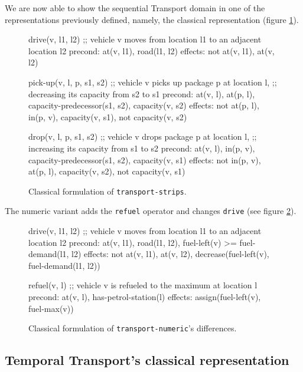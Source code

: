 We are now able to show the sequential Transport domain in one of the representations
previously defined, namely,
the classical representation (figure \ref{code:classical-strips}).



\begin{figure}[htb]
\begin{code}
drive(v, l1, l2)
  ;; vehicle v moves from location l1 to an adjacent location l2
  precond: at(v, l1), road(l1, l2)
  effects: not at(v, l1), at(v, l2)

pick-up(v, l, p, s1, s2)
  ;; vehicle v picks up package p at location l,
  ;; decreasing its capacity from s2 to s1
  precond: at(v, l), at(p, l), capacity-predecessor(s1, s2),
           capacity(v, s2)
  effects: not at(p, l), in(p, v), capacity(v, s1),
           not capacity(v, s2)
  
drop(v, l, p, s1, s2)
  ;; vehicle v drops package p at location l,
  ;; increasing its capacity from s1 to s2
  precond: at(v, l), in(p, v), capacity-predecessor(s1, s2),
           capacity(v, s1)
  effects: not in(p, v), at(p, l), capacity(v, s2),
           not capacity(v, s1)
\end{code}
\caption{Classical formulation of \texttt{transport-strips}.}
\label{code:classical-strips}
\end{figure}

The numeric variant adds the \verb+refuel+ operator and changes \verb+drive+ (see figure \ref{code:classical-numeric}).

\begin{figure}[htb]
\begin{code}
drive(v, l1, l2)
  ;; vehicle v moves from location l1 to an adjacent location l2
  precond: at(v, l1), road(l1, l2), fuel-left(v) >= fuel-demand(l1, l2)
  effects: not at(v, l1), at(v, l2),
           decrease(fuel-left(v),  fuel-demand(l1, l2))
  
refuel(v, l)
  ;; vehicle v is refueled to the maximum at location l
  precond: at(v, l), has-petrol-station(l)
  effects: assign(fuel-left(v), fuel-max(v))
\end{code}
\caption{Classical formulation of \texttt{transport-numeric}'s differences.}
\label{code:classical-numeric}
\end{figure}

\subsection{Temporal Transport's classical representation}

